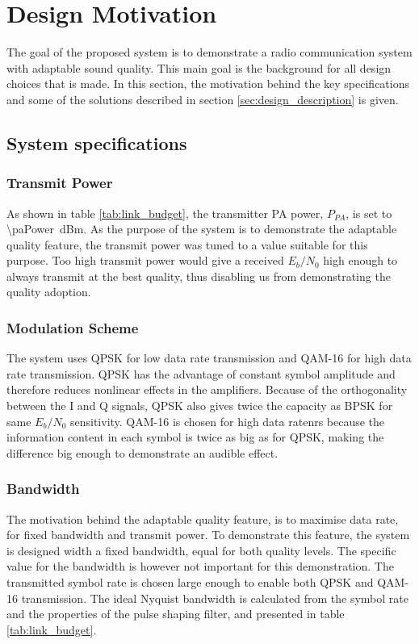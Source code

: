 \section{Design Motivation}
\label{sec:design_motivation}
The goal of the proposed system is to demonstrate a radio communication system with adaptable sound quality. This main goal is the background for all design choices that is made. In this section, the motivation behind the key specifications and some of the solutions described in section \ref{sec:design_description} is given.

\subsection{System specifications}
\subsubsection{Transmit Power}
As shown in table \ref{tab:link_budget}, the transmitter PA power, $P_{PA}$, is set to \SI{\paPower}{dBm}. As the purpose of the system is to demonstrate the adaptable quality feature, the transmit power was tuned to a value suitable for this purpose. Too high transmit power would give a received $E_b/N_0$ high enough to always transmit at the best quality, thus disabling us from demonstrating the quality adoption. 

\subsubsection{Modulation Scheme}
The system uses QPSK for low data rate transmission and QAM-16 for high data rate transmission. QPSK has the advantage of constant symbol amplitude and therefore reduces nonlinear effects in the amplifiers. Because of the orthogonality between the I and Q signals, QPSK also gives twice the capacity as BPSK for same $E_b/N_0$ sensitivity. QAM-16 is chosen for high data ratenrs because the information content in each symbol is twice as big as for QPSK, making the difference big enough to demonstrate an audible effect.

\subsubsection{Bandwidth}
The motivation behind the adaptable quality feature, is to maximise data rate, for fixed bandwidth and transmit power. To demonstrate this feature, the system is designed width a fixed bandwidth, equal for both quality levels. The specific value for the bandwidth is however not important for this demonstration. The transmitted symbol rate is chosen large enough to enable both QPSK and QAM-16 transmission. The ideal Nyquist bandwidth is calculated from the symbol rate and the properties of the pulse shaping filter, and presented in table \ref{tab:link_budget}. 


